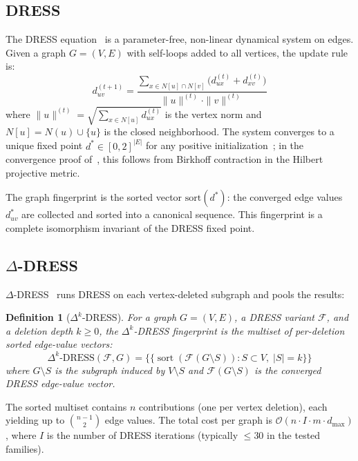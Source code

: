 \documentclass[11pt,a4paper]{article}
\newtheorem{definition}[theorem]{Definition}
\begin{document}
\subsection{DRESS}

The DRESS equation~\cite{castrillo2018dynamicstructuralsimilaritygraphs} is a parameter-free, non-linear dynamical system on edges.
Given a graph $G = (V, E)$ with self-loops added to all vertices, the update rule is:
\begin{equation}
\label{eq:dress}
d_{uv}^{(t+1)} = \frac{\sum_{x \in N[u] \cap N[v]} \bigl(d_{ux}^{(t)} + d_{xv}^{(t)}\bigr)}{\|u\|^{(t)} \cdot \|v\|^{(t)}}
\end{equation}
where $\|u\|^{(t)} = \sqrt{\sum_{x \in N[u]} d_{ux}^{(t)}}$ is the vertex norm and $N[u] = N(u) \cup \{u\}$ is the closed neighborhood.
The system converges to a unique fixed point $d^* \in [0, 2]^{|E|}$ for any positive initialization~\cite{castrillo2026dress}; in the convergence proof of~\cite{castrillo2026dress}, this follows from Birkhoff contraction in the Hilbert projective metric.

The graph fingerprint is the sorted vector $\text{sort}(d^*)$: the converged edge values $d_{uv}^*$ are collected and sorted into a canonical sequence.
This fingerprint is a complete isomorphism invariant of the DRESS fixed point.


\subsection{\texorpdfstring{$\Delta$}{Delta}-DRESS}

$\Delta$-DRESS~\cite{castrillo2026dress} runs DRESS on each vertex-deleted subgraph and pools the results:

\begin{definition}[$\Delta^k$-DRESS]
\label{def:delta1}
For a graph $G = (V, E)$, a DRESS variant $\mathcal{F}$, and a deletion depth $k \ge 0$, the $\Delta^k$-DRESS fingerprint is the multiset of per-deletion sorted edge-value vectors:
\[
\Delta^k\text{-DRESS}(\mathcal{F}, G) = \{\!\{ \operatorname{sort}(\mathcal{F}(G \setminus S)) : S \subset V,\; |S| = k \}\!\}
\]
where $G \setminus S$ is the subgraph induced by $V \setminus S$ and $\mathcal{F}(G \setminus S)$ is the converged DRESS edge-value vector.
\end{definition}

The sorted multiset contains $n$ contributions (one per vertex deletion), each yielding up to $\binom{n-1}{2}$ edge values.
The total cost per graph is $\mathcal{O}(n \cdot I \cdot m \cdot d_{\max})$, where $I$ is the number of DRESS iterations (typically $\leq 30$ in the tested families).
\end{document}
